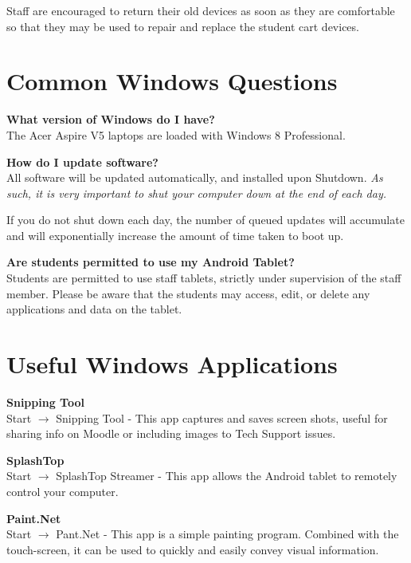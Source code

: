 \documentclass[10pt,foldmark,notumble]{leaflet}
\begin{document}
Staff are encouraged to return their old devices as soon as they are comfortable so that they may be used to repair and replace the student cart devices.

\section{Common Windows Questions\color{red}\hrulefill\color{black}}
\textbf{What version of Windows do I have?}\\
The Acer Aspire V5 laptops are loaded with Windows 8 Professional.

\textbf{How do I update software?}\\
All software will be updated automatically, and installed upon Shutdown. \emph{As such, it is very important to shut your computer down at the end of each day.}

If you do not shut down each day, the number of queued updates will accumulate and will exponentially increase the amount of time taken to boot up.

\textbf{Are students permitted to use my Android Tablet?}\\
Students are permitted to use staff tablets, strictly under supervision of the staff member. Please be aware that the students may access, edit, or delete any applications and data on the tablet.

\section{Useful Windows Applications\color{red}\hrulefill\color{black}}
\textbf{Snipping Tool}\\
Start $\to$ Snipping Tool - This app captures and saves screen shots, useful for sharing info on Moodle or including images to Tech Support issues.

\textbf{SplashTop}\\
Start $\to$ SplashTop Streamer - This app allows the Android tablet to remotely control your computer.

\textbf{Paint.Net}\\
Start $\to$ Pant.Net - This app is a simple painting program. Combined with the touch-screen, it can be used to quickly and easily convey visual information.

\end{document}
